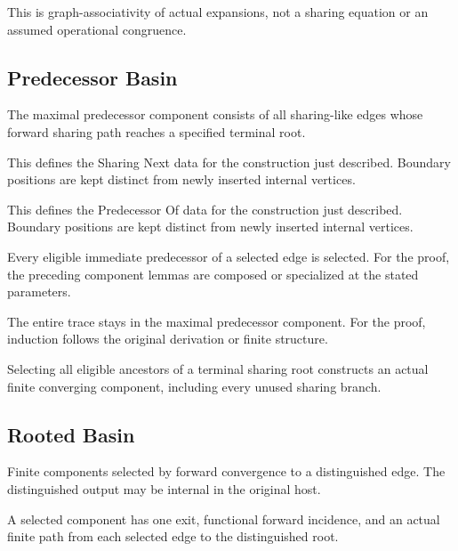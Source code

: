 This is graph-associativity of actual expansions, not a sharing equation or an assumed operational congruence.
\par{}

\subsection{Predecessor Basin}
The maximal predecessor component consists of all sharing-like edges whose forward sharing path reaches a specified terminal root.

This defines the Sharing Next data for the construction just described. Boundary positions are kept distinct from newly inserted internal vertices.
\par{}

This defines the Predecessor Of data for the construction just described. Boundary positions are kept distinct from newly inserted internal vertices.
\par{}

Every eligible immediate predecessor of a selected edge is selected.
For the proof, the preceding component lemmas are composed or specialized at the stated parameters.
\par{}

The entire trace stays in the maximal predecessor component.
For the proof, induction follows the original derivation or finite structure.
\par{}

Selecting all eligible ancestors of a terminal sharing root constructs an actual finite converging component, including every unused sharing branch.
\par{}

\subsection{Rooted Basin}
Finite components selected by forward convergence to a distinguished edge. The distinguished output may be internal in the original host.

A selected component has one exit, functional forward incidence, and an actual finite path from each selected edge to the distinguished root.
\par{}

